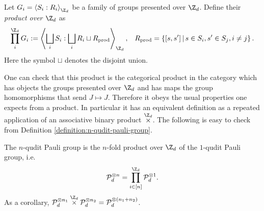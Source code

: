 \begin{definition}
	Let $G_i = \braket{S_i:R_i}_{\Z_d}$ be a family of groups presented over $\Z_d$. Define their \emph{product over $\Z_d$} as
	\begin{align}
		\prod^{\Z_d}_i G_i :=
		\Braket{
		\bigsqcup_i S_i:
		\bigsqcup_i R_i \sqcup R_\text{prod}
		}_{\Z_d},
		&&
		R_\text{prod} = \set{[s,s']\;s\in S_i, s'\in S_j, i\neq j}.
	\end{align}
	Here the symbol $\sqcup$ denotes the disjoint union.
\end{definition}
One can check that this product is the categorical product in the category which has objects the groups presented over $\Z_d$ and has maps the group homomorphisms that send $J\mapsto J$. Therefore it obeys the usual properties one expects from a product. In particular it has an equivalent definition as a repeated application of an associative binary product $\overset{\Z_d}\times$. The following is easy to check from Definition \ref{definition:n-qudit-pauli-group}.

\begin{lemma}
	The $n$-qudit Pauli group is the $n$-fold product over $\Z_d$ of the $1$-qudit Pauli group, i.e.\
	\begin{equation}
		\m P_d^{\otimes n} = \prod^{\Z_d}_{i\in[n]}\m P_d^{\otimes 1}.
	\end{equation}
	 As a corollary, 
	 $\m P_d^{\otimes n_1} \overset{\Z_d}\times \m P_d^{\otimes n_2} = \m P_d^{\otimes(n_1+n_2)}$.
\end{lemma}


